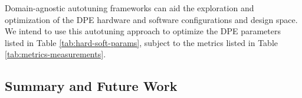 Domain-agnostic autotuning frameworks can aid the exploration and optimization
of the DPE hardware and software configurations and design space. We intend to
use this autotuning approach to optimize the DPE parameters listed in Table
\ref{tab:hard-soft-params}, subject to the metrics listed in Table
\ref{tab:metrics-measurements}.

\subsection{Summary and Future Work}
\label{subsec:DPEconcl}
